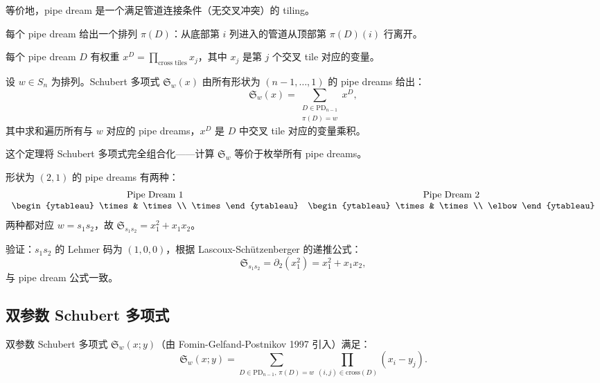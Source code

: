 等价地，pipe dream 是一个满足管道连接条件（无交叉冲突）的 tiling。

每个 pipe dream 给出一个排列 $\pi(D)$：从底部第 $i$ 列进入的管道从顶部第 $\pi(D)(i)$ 行离开。

每个 pipe dream $D$ 有权重 $x^D = \prod_{\text{cross tiles}} x_j$，其中 $x_j$ 是第 $j$ 个交叉 tile 对应的变量。

\begin{Theorem}
\label{th:PipeDreamSchubert}
设 $w \in S_n$ 为排列。Schubert 多项式 $\mathfrak{S}_w(x)$ 由所有形状为 $(n-1,\ldots,1)$ 的 pipe dreams 给出：
$$\mathfrak{S}_w(x) = \sum_{\substack{D \in \text{PD}_{n-1} \\ \pi(D) = w}} x^D,$$
其中求和遍历所有与 $w$ 对应的 pipe dreams，$x^D$ 是 $D$ 中交叉 tile 对应的变量乘积。
\end{Theorem}

这个定理将 Schubert 多项式完全组合化——计算 $\mathfrak{S}_w$ 等价于枚举所有 pipe dreams。

\begin{Example}[$n=3$, $w = s_1 s_2$]
形状为 $(2,1)$ 的 pipe dreams 有两种：
$$
\begin{array}{cc}
\text{Pipe Dream 1} & \text{Pipe Dream 2} \\
\begin{ytableau}
\times & \times \\
\times
\end{ytableau} &
\begin{ytableau}
\times & \times \\
\elbow
\end{ytableau}
\end{array}
$$
两种都对应 $w = s_1 s_2$，故 $\mathfrak{S}_{s_1 s_2} = x_1^2 + x_1 x_2$。

验证：$s_1 s_2$ 的 Lehmer 码为 $(1,0,0)$，根据 Lascoux-Schützenberger 的递推公式：
$$\mathfrak{S}_{s_1 s_2} = \partial_2(x_1^2) = x_1^2 + x_1 x_2,$$
与 pipe dream 公式一致。
\end{Example}

\subsection{双参数 Schubert 多项式}

双参数 Schubert 多项式 $\mathfrak{S}_w(x; y)$（由 Fomin-Gelfand-Postnikov 1997 引入）满足：
$$\mathfrak{S}_w(x; y) = \sum_{D \in \text{PD}_{n-1},\, \pi(D) = w} \prod_{(i,j) \in \text{cross}(D)} (x_i - y_j).$$

